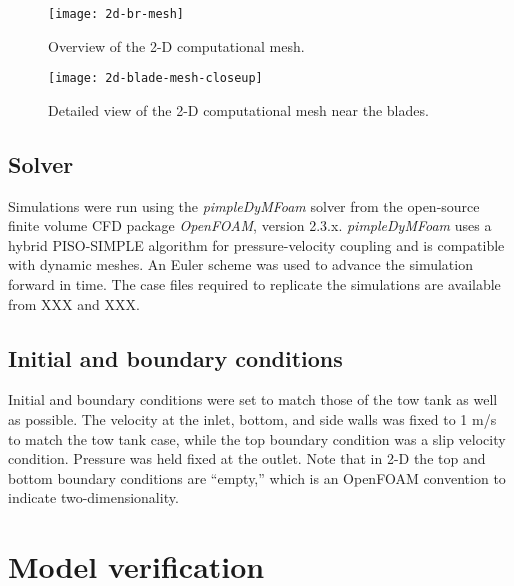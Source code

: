 \begin{figure}
    \centering
    
    \texttt{[image: 2d-br-mesh]}

    \caption{Overview of the 2-D computational mesh.}

    \label{fig:2d-br-mesh}
\end{figure}


\begin{figure}
    \centering
    
    \texttt{[image: 2d-blade-mesh-closeup]}

    \caption{Detailed view of the 2-D computational mesh near the blades.}

    \label{fig:blade-mesh}
\end{figure}


\subsection{Solver}

Simulations were run using the \textit{pimpleDyMFoam} solver from the
open-source finite volume CFD package \textit{OpenFOAM}, version 2.3.x.
\textit{pimpleDyMFoam} uses a hybrid PISO-SIMPLE algorithm for pressure-velocity
coupling and is compatible with dynamic meshes. An Euler scheme was used to
advance the simulation forward in time. The case files required to replicate the
simulations are available from XXX and XXX. 


\subsection{Initial and boundary conditions}

Initial and boundary conditions were set to match those of the tow tank as well
as possible. The velocity at the inlet, bottom, and side walls was fixed to 1
m/s to match the tow tank case, while the top boundary condition was a slip
velocity condition. Pressure was held fixed at the outlet. Note that in 2-D the
top and bottom boundary conditions are ``empty,'' which is an OpenFOAM
convention to indicate two-dimensionality.


\section{Model verification}

